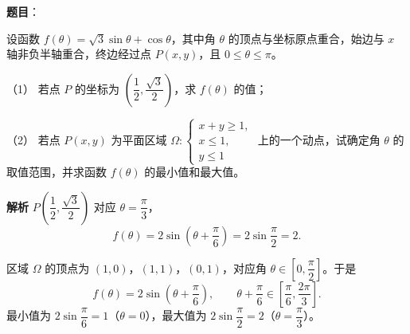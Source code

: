 \begin{answer}

\textbf{题目}：

设函数 $f(\theta)=\sqrt3\sin\theta+\cos\theta$，其中角 $\theta$ 的顶点与坐标原点重合，始边与 $x$ 轴非负半轴重合，终边经过点 $P(x,y)$，且 $0\leqslant\theta\leqslant\pi$。

（1） 若点 $P$ 的坐标为 $\left(\dfrac12,\dfrac{\sqrt3}2\right)$，求 $f(\theta)$ 的值；

（2） 若点 $P(x,y)$ 为平面区域 $\Omega:\begin{cases}x+y\geqslant1,\\x\leqslant1,\\y\leqslant1\end{cases}$ 上的一个动点，试确定角 $\theta$ 的取值范围，并求函数 $f(\theta)$ 的最小值和最大值。

\textbf{解析}
$P\left(\dfrac12,\dfrac{\sqrt3}2\right)$ 对应 $\theta=\dfrac\pi3$，
\nopagebreak[4]
\[f(\theta)=2\sin\left(\theta+\frac\pi6\right)=2\sin\frac\pi2=2.\]

区域 $\Omega$ 的顶点为 $(1,0)$，$(1,1)$，$(0,1)$，对应角 $\theta\in\left[0,\dfrac\pi2\right]$。于是
\nopagebreak[4]
\[f(\theta)=2\sin\left(\theta+\frac\pi6\right),\qquad \theta+\frac\pi6\in\left[\frac\pi6,\frac{2\pi}3\right].\]
最小值为 $2\sin\dfrac\pi6=1$（$\theta=0$），最大值为 $2\sin\dfrac\pi2=2$（$\theta=\dfrac\pi3$）。



\end{answer}
